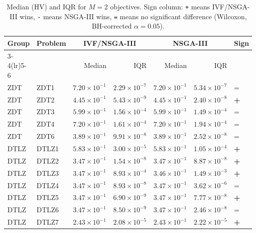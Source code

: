 \begin{table}[t]
\centering
\caption{Median (HV) and IQR for $M=2$ objectives. Sign column: \texttt{+} means IVF/NSGA-III wins, \texttt{-} means NSGA-III wins, \texttt{=} means no significant difference (Wilcoxon, BH-corrected $\alpha=0.05$).}
\label{tab:hv_m2_ivfnsgaiii}
\scriptsize
\begin{tabular}{llrrrrl}
\toprule
Group & Problem & \multicolumn{2}{c}{IVF/NSGA-III} & \multicolumn{2}{c}{NSGA-III} & Sign \\
\cmidrule(lr){3-4}\cmidrule(lr){5-6}
 & & Median & IQR & Median & IQR & \\
\midrule
ZDT & ZDT1 & $7.20\!\times\!10^{-1}$ & $2.29\!\times\!10^{-7}$ & $7.20\!\times\!10^{-1}$ & $5.34\!\times\!10^{-7}$ & = \\
ZDT & ZDT2 & $4.45\!\times\!10^{-1}$ & $5.43\!\times\!10^{-9}$ & $4.45\!\times\!10^{-1}$ & $2.40\!\times\!10^{-8}$ & \textbf{+} \\
ZDT & ZDT3 & $5.99\!\times\!10^{-1}$ & $1.56\!\times\!10^{-4}$ & $5.99\!\times\!10^{-1}$ & $1.49\!\times\!10^{-4}$ & = \\
ZDT & ZDT4 & $7.20\!\times\!10^{-1}$ & $1.61\!\times\!10^{-4}$ & $7.20\!\times\!10^{-1}$ & $1.94\!\times\!10^{-4}$ & = \\
ZDT & ZDT6 & $3.89\!\times\!10^{-1}$ & $9.91\!\times\!10^{-8}$ & $3.89\!\times\!10^{-1}$ & $2.52\!\times\!10^{-8}$ & = \\
\addlinespace
DTLZ & DTLZ1 & $5.83\!\times\!10^{-1}$ & $3.00\!\times\!10^{-5}$ & $5.83\!\times\!10^{-1}$ & $1.05\!\times\!10^{-4}$ & \textbf{+} \\
DTLZ & DTLZ2 & $3.47\!\times\!10^{-1}$ & $1.54\!\times\!10^{-8}$ & $3.47\!\times\!10^{-1}$ & $8.87\!\times\!10^{-8}$ & \textbf{+} \\
DTLZ & DTLZ3 & $3.47\!\times\!10^{-1}$ & $8.93\!\times\!10^{-4}$ & $3.46\!\times\!10^{-1}$ & $1.49\!\times\!10^{-3}$ & \textbf{+} \\
DTLZ & DTLZ4 & $3.47\!\times\!10^{-1}$ & $8.93\!\times\!10^{-8}$ & $3.47\!\times\!10^{-1}$ & $3.62\!\times\!10^{-6}$ & = \\
DTLZ & DTLZ5 & $3.47\!\times\!10^{-1}$ & $6.90\!\times\!10^{-9}$ & $3.47\!\times\!10^{-1}$ & $7.77\!\times\!10^{-8}$ & \textbf{+} \\
DTLZ & DTLZ6 & $3.47\!\times\!10^{-1}$ & $8.50\!\times\!10^{-9}$ & $3.47\!\times\!10^{-1}$ & $2.46\!\times\!10^{-8}$ & = \\
DTLZ & DTLZ7 & $2.43\!\times\!10^{-1}$ & $2.08\!\times\!10^{-5}$ & $2.43\!\times\!10^{-1}$ & $2.22\!\times\!10^{-5}$ & \textbf{+} \\

\end{tabular}
\end{table}
